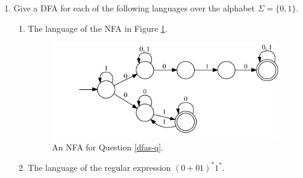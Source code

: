 \documentclass[11pt]{article}
\begin{document}
\begin{enumerate}
\item
\label{dfas-q}
Give a DFA for each of the following languages over the alphabet
$\Sigma = \{0, 1\}$.
\begin{enumerate}
\item The language of the NFA in Figure \ref{substr-odd}.
\begin{figure}[htb]
\begin{center}
\includegraphics[scale=0.7]{substr-odd.pdf}
\caption{An NFA for Question \ref{dfas-q}.}
\label{substr-odd}
\end{center}
\end{figure}

\item The language of the regular expression $(0 + 01)^{*}1^{*}$.
\end{enumerate}


\end{enumerate}
\end{document}
